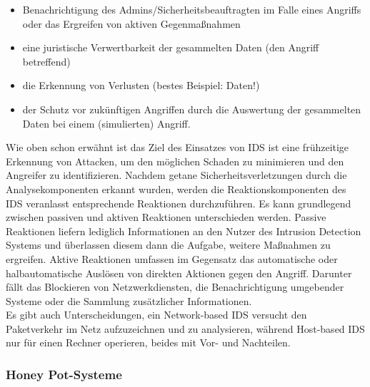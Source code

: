 \documentclass[letterpaper, 12pt]{article}
\let\tempsubsubsection\subsubsection
\renewcommand\subsubsection[1]{\vspace{0cm}\tempsubsubsection{#1}\vspace{0cm}}
\begin{document}
\begin{itemize}
	\item Benachrichtigung des Admins/Sicherheitsbeauftragten im Falle eines Angriffs oder
das Ergreifen von aktiven Gegenmaßnahmen
	\item eine juristische Verwertbarkeit der gesammelten Daten (den Angriff betreffend)
	\item die Erkennung von Verlusten (bestes Beispiel: Daten!)
	\item der Schutz vor zukünftigen Angriffen durch die Auswertung der gesammelten Daten
bei einem (simulierten) Angriff. \cite{ausarbeitungsec}
\end{itemize}

Wie oben schon erwähnt ist das Ziel des Einsatzes von IDS
ist eine frühzeitige Erkennung von Attacken, um den möglichen Schaden zu minimieren
und den Angreifer zu identifizieren. Nachdem getane Sicherheitsverletzungen durch die Analysekomponenten erkannt wurden,
werden die Reaktionskomponenten des IDS veranlasst entsprechende
Reaktionen durchzuführen. Es kann grundlegend zwischen passiven und aktiven
Reaktionen unterschieden werden. Passive Reaktionen liefern lediglich Informationen an
den Nutzer des Intrusion Detection Systems und überlassen diesem dann die Aufgabe, weitere Maßnahmen zu ergreifen.
Aktive Reaktionen umfassen im Gegensatz das automatische oder halbautomatische Auslösen
von direkten Aktionen gegen den Angriff. Darunter fällt das
Blockieren von Netzwerkdiensten, die Benachrichtigung umgebender Systeme oder die
Sammlung zusätzlicher Informationen. \\
Es gibt auch Unterscheidungen, ein Network-based IDS versucht den Paketverkehr im Netz aufzuzeichnen und zu analysieren, während Host-based IDS nur für einen Rechner operieren, beides mit Vor- und Nachteilen. \cite{ausarbeitungsec}

\subsubsection{Honey Pot-Systeme}
\end{document}
